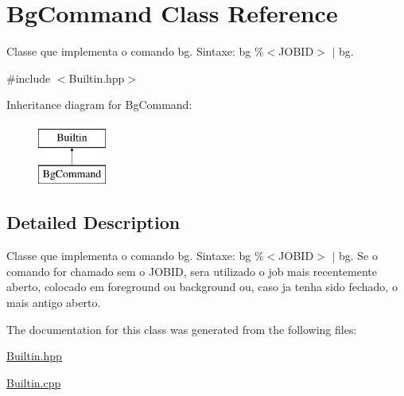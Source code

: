 \hypertarget{classBgCommand}{
\section{BgCommand Class Reference}
\label{classBgCommand}
}


Classe que implementa o comando bg. Sintaxe: bg \%$<$JOBID$>$ $|$ bg.  




{\ttfamily \#include $<$Builtin.hpp$>$}

Inheritance diagram for BgCommand:\begin{figure}[H]
\begin{center}
\leavevmode
\includegraphics[height=2.000000cm]{classBgCommand}
\end{center}
\end{figure}


\subsection{Detailed Description}
Classe que implementa o comando bg. Sintaxe: bg \%$<$JOBID$>$ $|$ bg. Se o comando for chamado sem o JOBID, sera utilizado o job mais recentemente aberto, colocado em foreground ou background ou, caso ja tenha sido fechado, o mais antigo aberto. 

The documentation for this class was generated from the following files:\begin{DoxyCompactItemize}
\item 
\hyperlink{Builtin_8hpp}{Builtin.hpp}\item 
\hyperlink{Builtin_8cpp}{Builtin.cpp}\end{DoxyCompactItemize}
